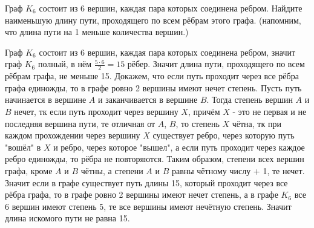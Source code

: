 \documentclass[a4paper, 16pt]{article}
\newenvironment{solution}[1][Решение]{%
	\begin{trivlist}
		\item[\hskip \labelsep {\bfseries #1:}]
		\item \hspace{15pt}
	}{
	\end{trivlist}
}
\begin{document}
		Граф
		$K_6$
		состоит из 6 вершин, каждая пара которых соединена ребром. Найдите наименьшую длину
		пути, проходящего по всем рёбрам этого графа. (напомним, что длина пути на 1 меньше количества
		вершин.)
		
		\begin{solution}
			
			
			
			
			Граф $K_6$ состоит из 6 вершин, каждая пара которых соединена ребром, значит граф $K_6$ полный, в нём $\frac{5\cdot6}{2} = 15$ рёбер. Значит длина пути, проходящего по всем рёбрам графа, не меньше 15. Докажем, что если путь проходит через все рёбра графа единожды, то в графе ровно 2 вершины имеют нечет степень. Пусть путь начинается в вершине $A$ и заканчивается в вершине $B$. Тогда степень вершин $A$ и $B$ нечет, тк если путь проходит через вершину $X$, причём $X$ - это не первая и не последняя вершина пути, те отличная от $A$, $B$, то степень $X$ чётна, тк при каждом прохождении через вершину $X$ существует ребро, через которую путь "вошёл" в $X$ и ребро, через которое "вышел", а если путь проходит через каждое ребро единожды, то рёбра не повторяются. Таким образом, степени всех вершин графа, кроме $A$ и $B$ чётны, а степени $A$ и $B$ равны чётному числу + 1, те нечет. Значит если в графе существует путь длины 15, который проходит через все рёбра графа, то в графе ровно 2 вершины имеют нечет степень, а в графе $K_6$ все 6 вершин имеют степень 5, те все вершины имеют нечётную степень. Значит длина искомого пути не равна 15.
			

\end{solution}
\end{document}
